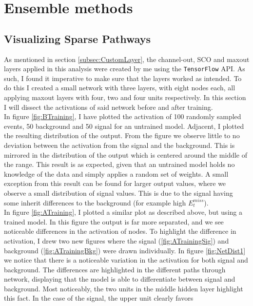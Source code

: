 \section{Ensemble methods}\label{sec:Ensemble}
\subsection{Visualizing Sparse Pathways}\label{subsec:Viz}
As mentioned in section \ref{subsec:CustomLayer}, the channel-out, \ac{SCO} and maxout layers applied in this 
analysis were created by me using the \verb!TensorFlow! \ac{API}. As such, I found it imperative to make
sure that the layers worked as intended. To do this I created a small network with three layers, with eight 
nodes each, all applying maxout layers with four, two and four units respectively. In this section I will 
dissect the activations of said network before and after training.
\\
In figure \ref{fig:BTraining}, I have plotted the activation of 100 randomly sampled events, 50 
background and 50 signal for an untrained model. Adjacent, I plotted the resulting distribution of the 
output. From the figure we observe little to no deviation between the activation from the signal and 
the background. This is mirrored in the distribution of the output which is centered around the middle 
of the range. This result is as expected, given that an untrained model holds no knowledge of the data and 
simply applies a random set of weights. A small exception from this result can be found for larger output values, 
where we observe a small distribution of signal values. This is due to the signal having some inherit differences
to the background (for example high $E_t^{miss}$).
\\
In figure \ref{fig:ATraining}, I plotted a similar plot as described above, but using a trained model.
In this figure the output is far more separated, and we see noticeable differences in the activation 
of nodes. To highlight the difference in activation, I drew two new figures where the signal 
(\ref{fig:ATrainingSig}) and background (\ref{fig:ATrainingBkg}) were drawn individually.
In figure \ref{fig:NetDist1} we notice that there is a noticeable variation in the activation for
both signal and background. The differences are highlighted in the different paths through network, displaying 
that the model is able to differentiate between signal and background. Most noticeably, the two units 
in the middle hidden layer highlight this fact. In the case of the signal, the upper unit clearly favors 

